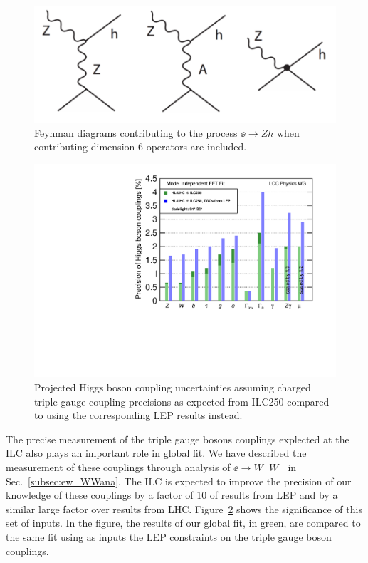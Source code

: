 \begin{figure}
\begin{center}
\includegraphics[width=0.80\hsize]{chapters/figures/Zhdiagrams.pdf}
\end{center}
\caption{Feynman diagrams contributing to the process $\ee\to Zh$ when 
contributing  dimension-6 operators are included. }
\label{fig:eeZhdiagrams}
\end{figure}

\begin{figure}
\begin{center}
\includegraphics[width=0.7\hsize]{chapters/figures/DeltaHXX_SM_ILC_TGC_MI.pdf}
\caption{Projected Higgs boson coupling uncertainties assuming charged triple gauge coupling precisions as expected from ILC250 compared to using the corresponding LEP results instead.}
\label{fig:WWeffectonH}
\end{center}
\end{figure}



The precise measurement of the triple gauge bosons couplings explected
at the ILC also plays an
important role in global fit.   We have described the measurement of
these couplings through analysis of $\ee\to W^+W^-$ in
Sec.~\ref{subsec:ew_WWana}.
The ILC is expected to improve the precision of our knowledge of these
couplings by a factor of 10 of results from LEP and by a similar large
factor over results from LHC.   Figure~\ref{fig:WWeffectonH} shows the
significance of this set of inputs.  In the figure, the results of our
global fit, in green, are compared to the same fit using as inputs the
LEP constraints on the triple gauge boson couplings.

